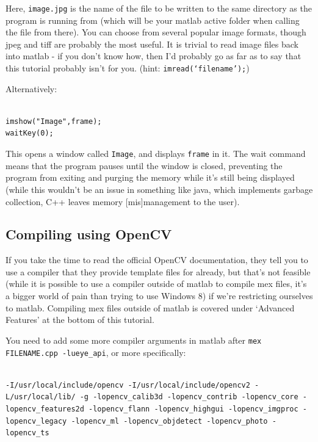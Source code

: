 \documentclass[12pt,a4paper]{article}
\begin{document}
Here, \texttt{image.jpg} is the name of the file to be written to the same directory as the program is running from (which will be your matlab active folder when calling the file from there). You can choose from several popular image formats, though jpeg and tiff are probably the most useful. It is trivial to read image files back into matlab - if you don't know how, then I'd probably go as far as to say that this tutorial probably isn't for you. (hint: \texttt{imread(`filename');})

Alternatively:

\lstset{language=C++}
\begin{lstlisting}

imshow("Image",frame);
waitKey(0);

\end{lstlisting}

This opens a window called \texttt{Image}, and displays \texttt{frame} in it. The wait command means that the program pauses until the window is closed, preventing the program from exiting and purging the memory while it's still being displayed (while this wouldn't be an issue in something like java, which implements garbage collection, C++ leaves memory [mis]management to the user).


\subsection{Compiling using OpenCV}

If you take the time to read the official OpenCV documentation, they tell you to use a compiler that they provide template files for already, but that's not feasible (while it is possible to use a compiler outside of matlab to compile mex files, it's a bigger world of pain than trying to use Windows 8) if we're restricting ourselves to matlab. Compiling mex files outside of matlab is covered under `Advanced Features' at the bottom of this tutorial.

You need to add some more compiler arguments in matlab after \texttt{mex FILENAME.cpp -lueye\_api}, or more specifically:

\lstset{language=C++}
\begin{lstlisting}

-I/usr/local/include/opencv -I/usr/local/include/opencv2 -L/usr/local/lib/ -g -lopencv_calib3d -lopencv_contrib -lopencv_core -lopencv_features2d -lopencv_flann -lopencv_highgui -lopencv_imgproc -lopencv_legacy -lopencv_ml -lopencv_objdetect -lopencv_photo -lopencv_ts

\end{lstlisting}
\end{document}
